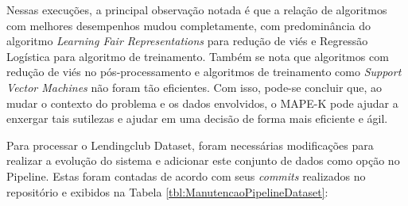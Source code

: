 \documentclass[portugues]{ic-tese}
\begin{document}
\begin{table}[H]
\begin{center}
  \caption{Melhores opções escolhidas pelo modelo MAPE-K \\ Todos os métodos - 25\% Performance/75\% Fairness}
\label{tbl:ScoreMAPEKLendingclubGeral2575}
\end{center}
\end{table}

Nessas execuções, a principal observação notada é que a relação de algoritmos com melhores desempenhos mudou completamente, com predominância do algoritmo \textit{Learning Fair Representations} para redução de viés e Regressão Logística para algoritmo de treinamento. Também se nota que algoritmos com redução de viés no pós-processamento e algoritmos de treinamento como \textit{Support Vector Machines} não foram tão eficientes. Com isso, pode-se concluir que, ao mudar o contexto do problema e os dados envolvidos, o MAPE-K pode ajudar a enxergar tais sutilezas e ajudar em uma decisão de forma mais eficiente e ágil.

Para processar o Lendingclub Dataset, foram necessárias modificações para realizar a evolução do sistema e adicionar este conjunto de dados como opção no Pipeline. Estas foram contadas de acordo com seus \textit{commits} realizados no repositório e exibidos  na Tabela \ref{tbl:ManutencaoPipelineDataset}:
\end{document}
